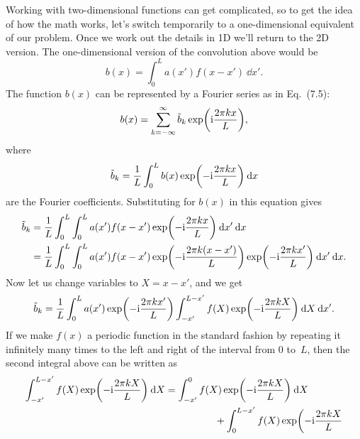 \documentclass[12pt]{article}
\begin{document}
\begin{exercises}
Working with two-dimensional functions can get complicated, so to get the
idea of how the math works, let's switch temporarily to a one-dimensional
equivalent of our problem.  Once we work out the details in 1D we'll return
to the 2D version.  The one-dimensional version of the convolution above
would be
\begin{displaymath}
b(x) = \int_0^L a(x') f(x-x') \>\dd x'.
\end{displaymath}
The function $b(x)$ can be represented by a Fourier series as in Eq.~(7.5):
\begin{displaymath}
b(x) = \sum_{k=-\infty}^\infty
         \tilde{b}_k \exp\biggl( \mathrm{i} {2\pi k x\over L} \biggr),
\end{displaymath}
where
\begin{displaymath}
\tilde{b}_k = {1\over L} \int_0^L b(x)
                         \exp\biggl( -\mathrm{i} {2\pi k x\over L} \biggr) \>\mathrm{d} x
\end{displaymath}
are the Fourier coefficients.  Substituting for $b(x)$ in this equation
gives
\begin{align*}
\tilde{b}_k &= {1\over L} \int_0^L \int_0^L a(x') f(x-x')
                         \exp\biggl( -\mathrm{i} {2\pi k x\over L} \biggr)
                         \>\mathrm{d} x'\>\mathrm{d} x \\
            &= {1\over L} \int_0^L \int_0^L a(x') f(x-x')
                         \exp\biggl( -\mathrm{i} {2\pi k (x-x')\over L} \biggr)
                         \exp\biggl( -\mathrm{i} {2\pi k x'\over L} \biggr)
                         \>\mathrm{d} x'\>\mathrm{d} x.
\end{align*}
Now let us change variables to $X=x-x'$, and we get
\begin{displaymath}
\tilde{b}_k = {1\over L} \int_0^L a(x')
                         \exp\biggl( -\mathrm{i} {2\pi k x'\over L} \biggr)
                         \int_{-x'}^{L-x'} f(X)
                         \exp\biggl( -\mathrm{i} {2\pi k X\over L} \biggr) \>\mathrm{d} X
                         \>\mathrm{d} x'.
\end{displaymath}
If we make $f(x)$ a periodic function in the standard fashion by repeating
it infinitely many times to the left and right of the interval from 0
to~$L$, then the second integral above can be written as
\begin{align*}
\int_{-x'}^{L-x'} f(X) \exp\biggl( -\ii {2\pi k X\over L} \biggr) \>\dd X
&= \int_{-x'}^0 f(X) \exp\biggl( -\ii {2\pi k X\over L} \biggr) \>\dd X
   \\
&\hspace{5em}{} + \int_0^{L-x'} f(X) \exp\biggl( -\ii {2\pi k X\over L}

\end{align*}
\end{exercises}
\end{document}
